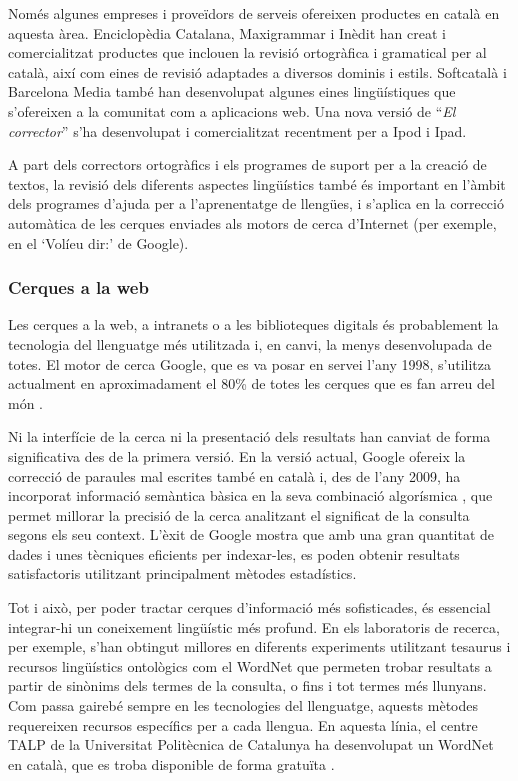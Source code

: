 \begin{multicols}{2}
Només algunes empreses i proveïdors de serveis ofereixen productes en català en aquesta àrea. Enciclopèdia Catalana, Maxigrammar i Inèdit han creat i comercialitzat productes que inclouen la revisió ortogràfica i gramatical per al català, així com eines de revisió adaptades a diversos dominis i estils. Softcatalà i Barcelona Media també han desenvolupat algunes eines lingüístiques que s’ofereixen a la comunitat com a aplicacions web. Una nova versió de “\textit{El corrector}” s’ha desenvolupat i comercialitzat recentment per a Ipod i Ipad. 

A part dels correctors ortogràfics i els programes de suport per a la creació de textos, la revisió dels diferents aspectes lingüístics també és important en l’àmbit dels programes d’ajuda per a l’aprenentatge de llengües, i s’aplica en la correcció automàtica de les cerques enviades als motors de cerca d’Internet (per exemple, en el ‘Volíeu dir:’ de Google). 

\subsubsection{Cerques a la web}

Les cerques a la web, a intranets o a les biblioteques digitals és probablement la tecnologia del llenguatge més utilitzada i, en canvi, la menys desenvolupada de totes. El motor de cerca Google, que es va posar en servei l’any 1998, s’utilitza actualment en aproximadament el 80\% de totes les cerques que es fan arreu del món \cite{CAT-Nota22}. 

Ni la interfície de la cerca ni la presentació dels resultats han canviat de forma significativa des de la primera versió. En la versió actual, Google ofereix la correcció de paraules mal escrites també en català i, des de l’any 2009, ha incorporat informació semàntica bàsica en la seva combinació algorísmica \cite{CAT-Nota23}, que permet millorar la precisió de la cerca analitzant el significat de la consulta segons els seu context. L’èxit de Google mostra que amb una gran quantitat de dades i unes tècniques eficients per indexar-les, es poden obtenir resultats satisfactoris utilitzant principalment mètodes estadístics.

Tot i això, per poder tractar cerques d’informació més sofisticades, és essencial integrar-hi un coneixement lingüístic més profund. En els laboratoris de recerca, per exemple, s’han obtingut millores en diferents experiments utilitzant tesaurus i recursos lingüístics ontològics com el WordNet que permeten trobar resultats a partir de sinònims dels termes de la consulta, o fins i tot termes més llunyans. Com passa gairebé sempre en les tecnologies del llenguatge, aquests mètodes requereixen recursos específics per a cada llengua. En aquesta línia, el centre TALP de la Universitat Politècnica de Catalunya ha desenvolupat un WordNet en català, que es troba disponible de forma gratuïta \cite{CAT-Nota24}. 


\end{multicols}
